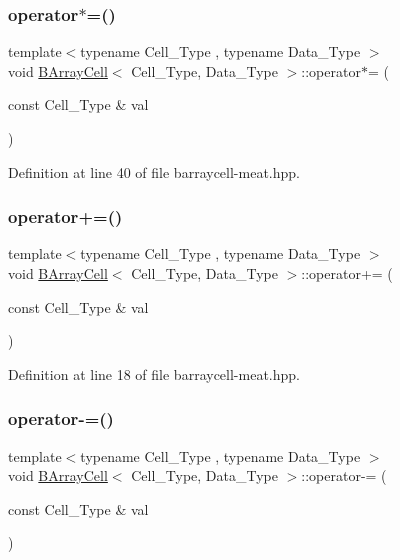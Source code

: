 \subsubsection{\texorpdfstring{operator$\ast$=()}{operator*=()}}
{\footnotesize\ttfamily template$<$typename Cell\+\_\+\+Type , typename Data\+\_\+\+Type $>$ \\
void \hyperlink{class_b_array_cell}{B\+Array\+Cell}$<$ Cell\+\_\+\+Type, Data\+\_\+\+Type $>$\+::operator$\ast$= (\begin{DoxyParamCaption}\item[{const Cell\+\_\+\+Type \&}]{val }\end{DoxyParamCaption})\hspace{0.3cm}{\ttfamily [inline]}}



Definition at line 40 of file barraycell-\/meat.\+hpp.

\mbox{\label{class_b_array_cell_a2e5c7efcf17bf4acaf17900fb781827b}} 
\subsubsection{\texorpdfstring{operator+=()}{operator+=()}}
{\footnotesize\ttfamily template$<$typename Cell\+\_\+\+Type , typename Data\+\_\+\+Type $>$ \\
void \hyperlink{class_b_array_cell}{B\+Array\+Cell}$<$ Cell\+\_\+\+Type, Data\+\_\+\+Type $>$\+::operator+= (\begin{DoxyParamCaption}\item[{const Cell\+\_\+\+Type \&}]{val }\end{DoxyParamCaption})\hspace{0.3cm}{\ttfamily [inline]}}



Definition at line 18 of file barraycell-\/meat.\+hpp.

\mbox{\label{class_b_array_cell_a2f2d39b5e9dfe7d0ef62a42445c85439}} 
\subsubsection{\texorpdfstring{operator-\/=()}{operator-=()}}
{\footnotesize\ttfamily template$<$typename Cell\+\_\+\+Type , typename Data\+\_\+\+Type $>$ \\
void \hyperlink{class_b_array_cell}{B\+Array\+Cell}$<$ Cell\+\_\+\+Type, Data\+\_\+\+Type $>$\+::operator-\/= (\begin{DoxyParamCaption}\item[{const Cell\+\_\+\+Type \&}]{val }\end{DoxyParamCaption})\hspace{0.3cm}{\ttfamily [inline]}}



